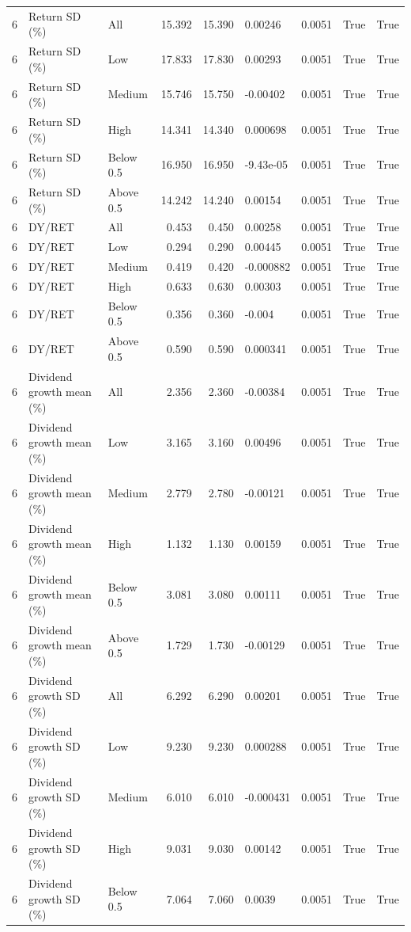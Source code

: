 \documentclass[10pt]{article}
\begin{document}
\begin{landscape}
\begin{longtable}{rllrrllrr}
6 & Return SD (\%) & All & 15.392 & 15.390 & 0.00246 & 0.0051 & True & True \\
6 & Return SD (\%) & Low & 17.833 & 17.830 & 0.00293 & 0.0051 & True & True \\
6 & Return SD (\%) & Medium & 15.746 & 15.750 & -0.00402 & 0.0051 & True & True \\
6 & Return SD (\%) & High & 14.341 & 14.340 & 0.000698 & 0.0051 & True & True \\
6 & Return SD (\%) & Below 0.5 & 16.950 & 16.950 & -9.43e-05 & 0.0051 & True & True \\
6 & Return SD (\%) & Above 0.5 & 14.242 & 14.240 & 0.00154 & 0.0051 & True & True \\
6 & DY/RET & All & 0.453 & 0.450 & 0.00258 & 0.0051 & True & True \\
6 & DY/RET & Low & 0.294 & 0.290 & 0.00445 & 0.0051 & True & True \\
6 & DY/RET & Medium & 0.419 & 0.420 & -0.000882 & 0.0051 & True & True \\
6 & DY/RET & High & 0.633 & 0.630 & 0.00303 & 0.0051 & True & True \\
6 & DY/RET & Below 0.5 & 0.356 & 0.360 & -0.004 & 0.0051 & True & True \\
6 & DY/RET & Above 0.5 & 0.590 & 0.590 & 0.000341 & 0.0051 & True & True \\
6 & Dividend growth mean (\%) & All & 2.356 & 2.360 & -0.00384 & 0.0051 & True & True \\
6 & Dividend growth mean (\%) & Low & 3.165 & 3.160 & 0.00496 & 0.0051 & True & True \\
6 & Dividend growth mean (\%) & Medium & 2.779 & 2.780 & -0.00121 & 0.0051 & True & True \\
6 & Dividend growth mean (\%) & High & 1.132 & 1.130 & 0.00159 & 0.0051 & True & True \\
6 & Dividend growth mean (\%) & Below 0.5 & 3.081 & 3.080 & 0.00111 & 0.0051 & True & True \\
6 & Dividend growth mean (\%) & Above 0.5 & 1.729 & 1.730 & -0.00129 & 0.0051 & True & True \\
6 & Dividend growth SD (\%) & All & 6.292 & 6.290 & 0.00201 & 0.0051 & True & True \\
6 & Dividend growth SD (\%) & Low & 9.230 & 9.230 & 0.000288 & 0.0051 & True & True \\
6 & Dividend growth SD (\%) & Medium & 6.010 & 6.010 & -0.000431 & 0.0051 & True & True \\
6 & Dividend growth SD (\%) & High & 9.031 & 9.030 & 0.00142 & 0.0051 & True & True \\
6 & Dividend growth SD (\%) & Below 0.5 & 7.064 & 7.060 & 0.0039 & 0.0051 & True & True \\
\end{longtable}


\end{landscape}
\end{document}
